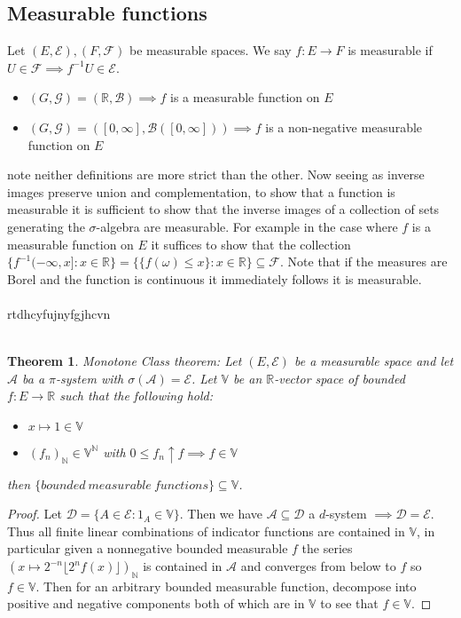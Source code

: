 \documentclass{article}
\newtheorem{theorem}{Theorem}[section]
\begin{document}
\subsection{Measurable functions}
Let $(E,\mathcal E),(F,\mathcal F)$ be measurable spaces.  We say $f:E\rightarrow F$ is measurable if $U\in\mathcal F \implies f^{-1}U\in \mathcal E$.
\begin{itemize}
  \item $(G,\mathcal G)=(\mathbb R,\mathcal B)\implies f$ is a measurable function on $E$
  \item $(G,\mathcal G)=([0,\infty],\mathcal B([0,\infty]))\implies f$ is a non-negative measurable function on $E$
\end{itemize}
note neither definitions are more strict than the other.  Now seeing as inverse images preserve union and complementation, to show that a function is measurable it is sufficient to show that the inverse images of a collection of sets generating the $\sigma$-algebra are measurable.  For example in the case where $f$ is a measurable function on $E$ it suffices to show that the collection $\{f^{-1}(-\infty,x]:x\in\mathbb R\}=\{\{f(\omega)\leq x\}:x\in\mathbb R\}\subseteq\mathcal F$.  Note that if the measures are Borel and the function is continuous it immediately follows it is measurable.
\\
\\
rtdhcyfujnyfgjhcvn
\\
\\
\begin{theorem}
  Monotone Class theorem: Let $(E,\mathcal E)$ be a measurable space and let $\mathcal A$ ba a $\pi$-system with $\sigma(\mathcal A)=\mathcal E$.  Let $\mathbb V$ be an $\mathbb{R}$-vector space of bounded $f:E\rightarrow\mathbb{R}$ such that the following hold:
  \begin{itemize}
    \item $x\mapsto1\in\mathbb V$
    \item $(f_n)_\mathbb{N}\in\mathbb V^\mathbb{N}$ with $0\leq f_n \uparrow f\implies f\in\mathbb V$
  \end{itemize}
  then $\{bounded~measurable~functions\}\subseteq\mathbb V$.
\end{theorem}
\begin{proof}
  Let $\mathcal D =\{A\in\mathcal E:1_A\in\mathbb V\}$.  Then we have $\mathcal A \subseteq\mathcal D$ a $d$-system $\implies \mathcal D = \mathcal E$.  Thus all finite linear combinations of indicator functions are contained in $\mathbb{V}$, in particular given a nonnegative bounded measurable $f$ the series $(x\mapsto2^{-n}\lfloor2^nf(x)\rfloor)_\mathbb{N}$ is contained in $\mathcal A$ and converges from below to $f$ so $f\in\mathbb V$.  Then for an arbitrary bounded measurable function, decompose into positive and negative components both of which are in $\mathbb V$ to see that $f\in\mathbb V$.
\end{proof}
\end{document}
